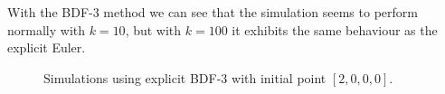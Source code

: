 \documentclass{article}
\begin{document}
With the BDF-3 method we can see that the simulation seems to perform normally with \(k=10\), but with \(k=100\) it exhibits the same behaviour as the explicit Euler.

\begin{figure}[H]
\centering
{}\hfill
{}\hfill
\caption{Simulations using explicit BDF-3 with initial point \(\left[2,0,0,0\right]\).} \label{Fig3_3}
\end{figure}
\end{document}
